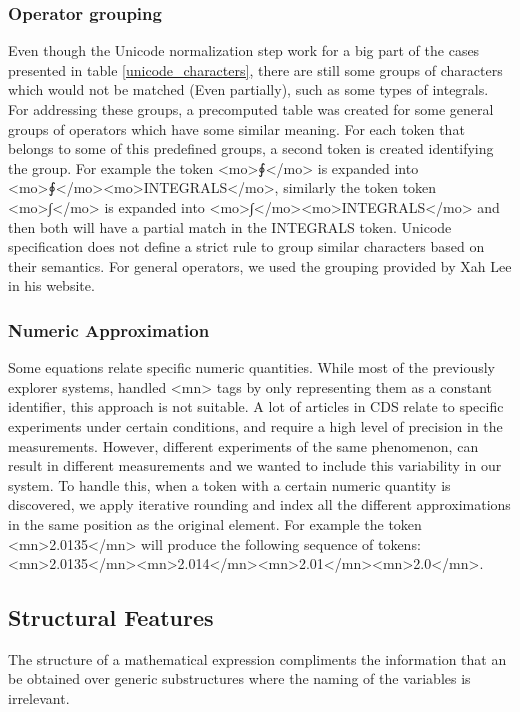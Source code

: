 \subsubsection{Operator grouping}
Even though the Unicode normalization step work for a big part of the cases presented in table \ref{unicode_characters}, there are still some groups of characters which would not be matched (Even partially), such as some types of integrals. For addressing these groups, a precomputed table was created for some general groups of operators which have some similar meaning. For each token that belongs to some of this predefined groups, a second token is created identifying the group.
For example the token <mo>{\unicodefont ∮}</mo> is expanded into <mo>{\unicodefont ∮}</mo><mo>INTEGRALS</mo>, similarly the token token <mo>{\unicodefont ∫}</mo> is expanded into <mo>{\unicodefont ∫}</mo><mo>INTEGRALS</mo> and then both will have a partial match in the INTEGRALS token. 
Unicode specification does not define a strict rule to group similar characters based on their semantics. For general operators, we used the grouping provided by Xah Lee in his website\cite{math_groups}.

\subsubsection{Numeric Approximation} 
Some equations relate specific numeric quantities. While most of the previously explorer systems, handled <mn> tags by only representing them as a constant identifier, this approach is not suitable. A lot of articles in CDS relate to specific experiments under certain conditions, and require a high level of precision in the measurements. However, different experiments of the same phenomenon, can result in different measurements and we wanted to include this variability in our system. To handle this, when a token with a certain numeric quantity is discovered, we apply iterative rounding and index all the different approximations in the same position as the original element. For example the token <mn>2.0135</mn> will produce the following sequence of tokens: <mn>2.0135</mn><mn>2.014</mn><mn>2.01</mn><mn>2.0</mn>. 


\subsection{Structural Features}
The structure of a mathematical expression compliments the information that an be obtained over generic substructures where the naming of the variables is irrelevant.  

